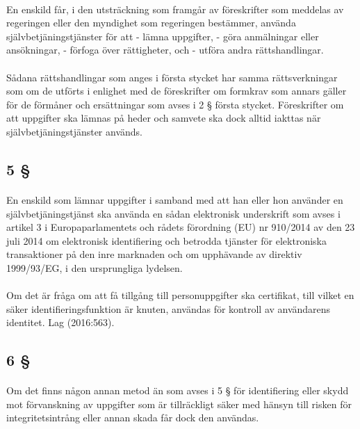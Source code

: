 \documentclass[a4paper,notitlepage,openany,10pt]{book}
\begin{document}
\paragraph*{}
En enskild får, i den utsträckning som framgår av föreskrifter som meddelas av regeringen eller den myndighet som regeringen bestämmer, använda självbetjäningstjänster för att
\newline - lämna uppgifter,
\newline - göra anmälningar eller ansökningar,
\newline - förfoga över rättigheter, och
\newline - utföra andra rättshandlingar.
\paragraph*{}
Sådana rättshandlingar som anges i första stycket har samma rättsverkningar som om de utförts i enlighet med de föreskrifter om formkrav som annars gäller för de förmåner och ersättningar som avses i 2 § första stycket. Föreskrifter om att uppgifter ska lämnas på heder och samvete ska dock alltid iakttas när självbetjäningstjänster används.
\subsection*{5 §}
\paragraph*{}
En enskild som lämnar uppgifter i samband med att han eller hon använder en självbetjäningstjänst ska använda en sådan elektronisk underskrift som avses i artikel 3 i Europaparlamentets och rådets förordning (EU) nr 910/2014 av den 23 juli 2014 om elektronisk identifiering och betrodda tjänster för elektroniska transaktioner på den inre marknaden och om upphävande av direktiv 1999/93/EG, i den ursprungliga lydelsen.
\paragraph*{}
Om det är fråga om att få tillgång till personuppgifter ska certifikat, till vilket en säker identifieringsfunktion är knuten, användas för kontroll av användarens identitet.
Lag (2016:563).
\subsection*{6 §}
\paragraph*{}
Om det finns någon annan metod än som avses i 5 § för identifiering eller skydd mot förvanskning av uppgifter som är tillräckligt säker med hänsyn till risken för integritetsintrång eller annan skada får dock den användas.
\end{document}
